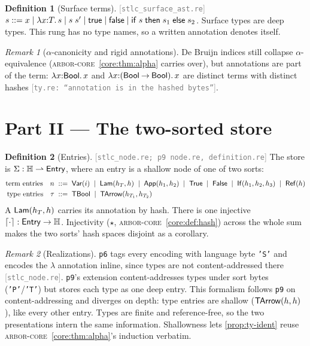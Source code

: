 \documentclass[11pt]{article}
\theoremstyle{definition}
\newtheorem{definition}{Definition}[section]
\theoremstyle{plain}
\theoremstyle{remark}
\newtheorem{remark}{Remark}[section]
\newcommand{\src}[1]{{\footnotesize\textcolor{gray}{[\texttt{#1}]}}}
\newcommand{\arborcore}{\textsc{arbor-core}}
\newcommand{\coreref}[1]{\arborcore~\cref{core:#1}}
\begin{document}
\begin{definition}[Surface terms]\label{def:surface}
\src{stlc\_surface\_ast.re} $s ::= x \mid \lambda x{:}T.\,s \mid s\;s' \mid
\mathsf{true} \mid \mathsf{false} \mid \mathsf{if}\;s\;\mathsf{then}\;s_1\;\mathsf{else}\;s_2$. Surface types are deep types. This rung has no
type names, so a written annotation denotes itself.
\end{definition}

\begin{remark}[$\alpha$-canonicity and rigid annotations]\label{rem:alpha-ann}
De Bruijn indices still collapse $\alpha$-equivalence (\coreref{thm:alpha} carries over), but
annotations are part of the term: $\lambda x{:}\mathsf{Bool}.\,x$ and
$\lambda x{:}(\mathsf{Bool} \mathbin{\to} \mathsf{Bool}).\,x$ are distinct terms with distinct hashes
\src{ty.re: ``annotation is in the hashed bytes''}.
\end{remark}

\section{Part II --- The two-sorted store}\label{sec:store2}

\begin{definition}[Entries]\label{def:entry}
\src{stlc\_node.re; p9 node.re, definition.re} The store is
$\Sigma : \mathbb{H} \rightharpoonup \mathsf{Entry}$, where an entry is a shallow node of one of two sorts:
\begin{align*}
  \text{term entries}\quad n &\;::=\; \mathsf{Var}(i) \;\mid\; \mathsf{Lam}(h_T,h) \;\mid\;
    \mathsf{App}(h_1,h_2) \;\mid\; \mathsf{True} \;\mid\; \mathsf{False} \;\mid\; \mathsf{If}(h_1,h_2,h_3)
    \;\mid\; \mathsf{Ref}(h)\\
  \text{type entries}\quad \tau &\;::=\; \mathsf{TBool} \;\mid\; \mathsf{TArrow}(h_{T_1},h_{T_2})
\end{align*}
A $\mathsf{Lam}(h_T,h)$ carries its annotation by hash. There is one injective
$\lceil \cdot \rceil : \mathsf{Entry} \to \mathbb{H}$. Injectivity ($\star$, \coreref{def:hash}) across the
whole sum makes the two sorts' hash spaces disjoint as a corollary.
\end{definition}

\begin{remark}[Realizations]\label{rem:two-sort-hash}
\texttt{p6} tags every encoding with language byte \texttt{'S'} and encodes the $\lambda$
annotation inline, since types are not content-addressed there \src{stlc\_node.re}.
\texttt{p9}'s extension content-addresses types under sort bytes (\texttt{'P'}/\texttt{'T'})
but stores each type as one deep entry. This formalism follows \texttt{p9} on
content-addressing and diverges on depth: type entries are shallow ($\mathsf{TArrow}(h,h)$), like
every other entry. Types are finite and reference-free, so the two presentations intern the
same information. Shallowness lets \cref{prop:ty-ident} reuse \coreref{thm:alpha}'s induction
verbatim.
\end{remark}
\end{document}
